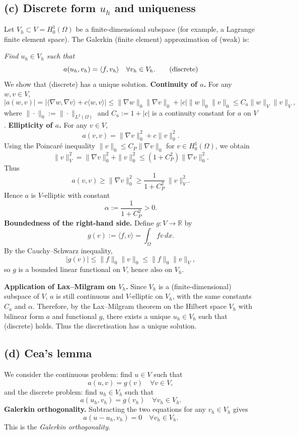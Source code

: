 \subsection*{(c) Discrete form $u_h$ and uniqueness}
Let $V_h \subset V = H^1_0(\Omega)$ be a finite-dimensional subspace (for
example, a Lagrange finite element space).
The Galerkin (finite element) approximation of (weak) is:

\emph{Find $u_h \in V_h$ such that}
\[
  a(u_h, v_h) = \langle f, v_h\rangle
  \quad \forall v_h \in V_h. \tag{\text{discrete}}
\]
We show that (discrete) has a unique solution.
\textbf{Continuity of $a$.}
For any $w,v \in V$,
\[
  |a(w,v)|
  = \bigl|\langle \nabla w,\nabla v\rangle + c\langle w,v\rangle \bigr|
  \le \|\nabla w\|_0 \|\nabla v\|_0 + |c| \|w\|_0 \|v\|_0
  \le C_a \|w\|_V \|v\|_V,
\]
where $\|\cdot\|_0 := \|\cdot\|_{L^2(\Omega)}$ and
$C_a := 1 + |c|$ is a continuity constant for $a$ on $V$.
\textbf{Ellipticity of $a$.}
For any $v \in V$,
\[
  a(v,v) = \|\nabla v\|_0^2 + c \|v\|_0^2.
\]
Using the Poincaré inequality
$\|v\|_0 \le C_P \|\nabla v\|_0$ for $v \in H^1_0(\Omega)$, we obtain
\[
  \|v\|_V^2
  = \|\nabla v\|_0^2 + \|v\|_0^2
  \le (1 + C_P^2) \|\nabla v\|_0^2.
\]
Thus
\[
  a(v,v) \ge \|\nabla v\|_0^2
  \ge \frac{1}{1 + C_P^2} \,\|v\|_V^2.
\]
Hence $a$ is $V$-elliptic with constant
\[
  \alpha := \frac{1}{1 + C_P^2} > 0.
\]
\textbf{Boundedness of the right-hand side.}
Define $g : V \to \mathbb{R}$ by
\[
  g(v) := \langle f,v\rangle = \int_\Omega f v \, dx.
\]
By the Cauchy--Schwarz inequality,
\[
  |g(v)| \le \|f\|_0 \|v\|_0 \le \|f\|_0 \|v\|_V,
\]
so $g$ is a bounded linear functional on $V$, hence also on $V_h$.

\textbf{Application of Lax--Milgram on $V_h$.}
Since $V_h$ is a (finite-dimensional) subspace of $V$,
$a$ is still continuous and $V$-elliptic on $V_h$, with the same constants
$C_a$ and $\alpha$.
Therefore, by the Lax--Milgram theorem on the Hilbert space $V_h$ with
bilinear form $a$ and functional $g$, there exists a unique
$u_h \in V_h$ such that (discrete) holds.
Thus the discretisation has a unique solution.

\subsection*{(d) Cea's lemma}
We consider the continuous problem: find $u \in V$ such that
\[
  a(u,v) = g(v) \quad \forall v \in V,
\]
and the discrete problem: find $u_h \in V_h$ such that
\[
  a(u_h, v_h) = g(v_h) \quad \forall v_h \in V_h.
\]
\textbf{Galerkin orthogonality.}
Subtracting the two equations for any $v_h \in V_h$ gives
\[
  a(u - u_h, v_h) = 0 \quad \forall v_h \in V_h.
\]
This is the \emph{Galerkin orthogonality}.

